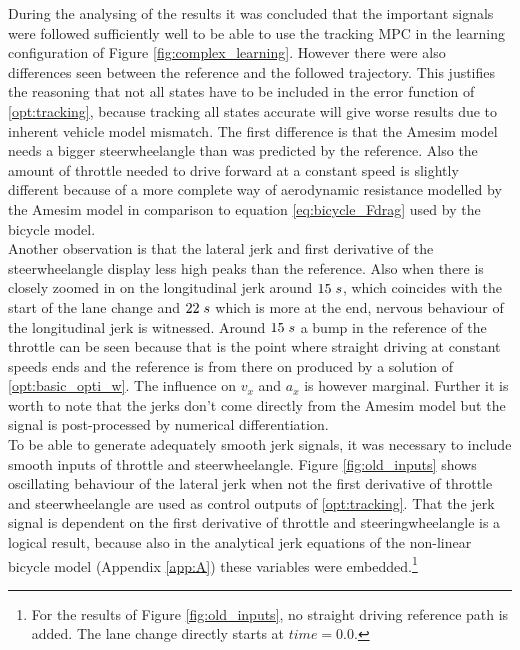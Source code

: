 During the analysing of the results it was concluded that the important signals were followed sufficiently well to be able to use the tracking MPC in the learning configuration of Figure \ref{fig:complex_learning}. However there were also differences seen between the reference and the followed trajectory. This justifies the reasoning that not all states have to be included in the error function of \ref{opt:tracking}, because tracking all states accurate will give worse results due to inherent vehicle model mismatch. The first difference is that the Amesim model needs a bigger steerwheelangle than was predicted by the reference. Also the amount of throttle needed to drive forward at a constant speed is slightly different because of a more complete way of aerodynamic resistance modelled by the Amesim model in comparison to equation \ref{eq:bicycle_Fdrag} used by the bicycle model.\\
Another observation is that the lateral jerk and first derivative of the steerwheelangle display less high peaks than the reference. Also when there is closely zoomed in on the longitudinal jerk around $15\hspace{1mm}s$, which coincides with the start of the lane change and $22\hspace{1mm}s$ which is more at the end, nervous behaviour of the longitudinal jerk is witnessed. Around $15\hspace{1mm}s$ a bump in the reference of the throttle can be seen because that is the point where straight driving at constant speeds ends and the reference is from there on  produced by a solution of \ref{opt:basic_opti_w}. The influence on $v_x$ and $a_x$ is however marginal. Further it is worth to note that the jerks don't come directly from the Amesim model but the signal is post-processed by numerical differentiation. \\

To be able to generate adequately smooth jerk signals, it was necessary to include smooth inputs of throttle and steerwheelangle. Figure \ref{fig:old_inputs} shows oscillating behaviour of the lateral jerk when not the first derivative of throttle and steerwheelangle are used as control outputs of \ref{opt:tracking}. That the jerk signal is dependent on the first derivative of throttle and steeringwheelangle is a logical result, because also in the analytical jerk equations of the non-linear bicycle model (Appendix \ref{app:A}) these variables were embedded.\footnote{For the results of Figure \ref{fig:old_inputs}, no straight driving reference path is added. The lane change directly starts at $time = 0.0$.}

